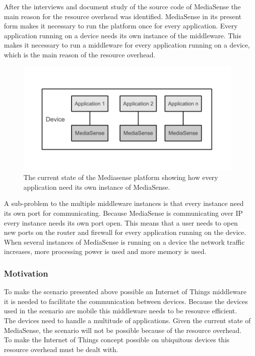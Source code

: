 After the interviews and document study of the source code of MediaSense the main reason for the resource overhead was identified. MediaSense in its present form makes it necessary to run the platform once for every application. Every application running on a device needs its own instance of the middleware. This makes it necessary to run a middleware for every application running on a device, which is the main reason of the resource overhead. 

\begin{figure}[h!]
		\centering
    	\includegraphics[scale=0.75]{part_4/result_and_analysis/mediasense_arch_old.pdf}
		\caption{The current state of the Mediasense platform showing how every application need its own instance of MediaSense.} 
\end{figure}

A sub-problem to the multiple middleware instances is that every instance need its own port for communicating. Because MediaSense is communicating over IP every instance needs its own port open. This means that a user needs to open new ports on the router and firewall for every application running on the device. When several instances of MediaSense is running on a device the network traffic increases, more processing power is used and more memory is used. 

\subsubsection{Motivation}
To make the scenario presented above possible an Internet of Things middleware it is needed to facilitate the communication between devices. Because the devices used in the scenario are mobile this middleware needs to be resource efficient. The devices need to handle a multitude of applications. Given the current state of MediaSense, the scenario will not be possible because of the resource overhead. To make the Internet of Things concept possible on ubiquitous devices this resource overhead must be dealt with.

